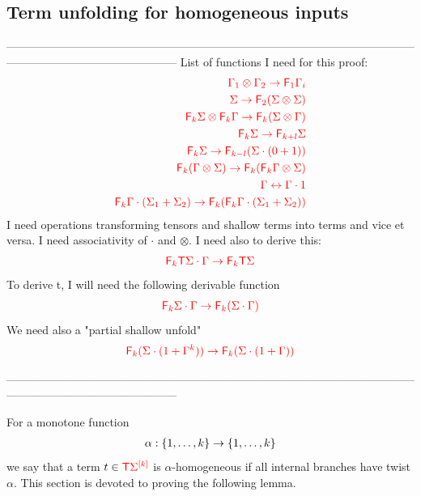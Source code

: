 
\subsection{Term unfolding for homogeneous inputs}
\label{sec:homo-unfold}


---------------------------------------------------------------------------------------------------------------------------------------------------------
List of functions I need for this proof:
\begin{align*}
{\color{red}{\Gamma_1\otimes\Gamma_2 \to {\color{red}{\mathsf F_{1}}}\Gamma_i}}\\
{\color{red}{\Sigma\to {\color{red}{\mathsf F_{2}}}(\Sigma\otimes \Sigma)}}\\
{\color{red}{{\color{red}{\mathsf F_{k}}}\Sigma \otimes {\color{red}{\mathsf F_{k}}}\Gamma \to {\color{red}{\mathsf F_{k}}}(\Sigma\otimes \Gamma)}}\\
{\color{red}{{\color{red}{\mathsf F_{k}}}\Sigma \to {\color{red}{\mathsf F_{k+l}}}\Sigma }}\\
{\color{red}{{\color{red}{\mathsf F_{k}}}\Sigma \to {\color{red}{\mathsf F_{k-l}}}(\Sigma\cdot(0+1))}}\\
{\color{red}{{\color{red}{\mathsf F_{k}}}(\Gamma\otimes \Sigma) \to {\color{red}{\mathsf F_{k}}}({\color{red}{\mathsf F_{k}}}\Gamma \otimes \Sigma)}}\\
{\color{red}{\Gamma \leftrightarrow \Gamma\cdot 1}}\\
{\color{red}{{\color{red}{\mathsf F_{k}}}\Gamma\cdot(\Sigma_1+\Sigma_2)\to {\color{red}{\mathsf F_{k}}}({\color{red}{\mathsf F_{k}}}\Gamma\cdot(\Sigma_1+\Sigma_2))}}
\end{align*}
I need operations transforming tensors and shallow terms into terms and vice et versa.
I need associativity of $\cdot$ and $\otimes$.
I need also to derive this:
\begin{align*}
{\color{red}{{\color{red}{\mathsf F_{k}}}{\color{red}{\mathsf T}}\Sigma\cdot\Gamma\to {\color{red}{\mathsf F_{k}}}{\color{red}{\mathsf T}}\Sigma}}
\end{align*}
To derive t, I will need the following derivable function
\begin{align*}
{\color{red}{{\color{red}{\mathsf F_{k}}}\Sigma\cdot \Gamma\to {\color{red}{\mathsf F_{k}}}(\Sigma\cdot \Gamma)}}
\end{align*}
We need also a "partial shallow unfold"
\begin{align*}
{\color{red}{{\color{red}{\mathsf F_{k}}}(\Sigma\cdot (1+\Gamma^k))\to {\color{red}{\mathsf F_{k}}}(\Sigma\cdot(1+\Gamma))}}
\end{align*}

---------------------------------------------------------------------------------------------------------------------------------------------------------
\bigskip

For a monotone function 
\begin{align*}
\alpha: \{1,\ldots,k\} \to \{1,\ldots,k\}
\end{align*}
we say that a term $ t \in {\color{red}{\mathsf T}} {\color{red}{\Sigma}}^{{\color{red}{[k]}}}$ is $\alpha$-homogeneous if all internal branches have twist $\alpha$. This section is devoted to proving the following lemma. 

